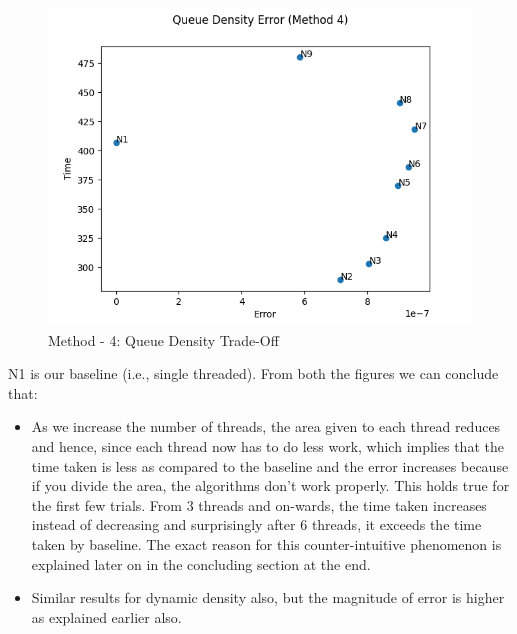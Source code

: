 \documentclass[paper=a4, fontsize = 12pt]{scrartcl}
\numberwithin{equation}{section}		%
\numberwithin{figure}{section}			%
\numberwithin{table}{section}				%
\begin{document}
\begin{figure}[H]
    \centering
    \captionsetup{justification=centering,margin=2cm}
    \includegraphics[width = 15cm]{method4_tradeoff_queue.png}
    \caption{Method - 4: Queue Density Trade-Off}
    \label{fig:M4QueueTradeOff}
\end{figure}
N1 is our baseline (i.e., single threaded). From both the figures we can conclude that: 

\begin{itemize}
    \item As we increase the number of threads, the area given to each thread reduces and hence, since each thread now has to do less work, which implies that the time taken is less as compared to the baseline and the error increases because if you divide the area, the algorithms don't work properly. This holds true for the first few trials. From 3 threads and on-wards, the time taken increases instead of decreasing and surprisingly after 6 threads, it exceeds the time taken by baseline. The exact reason for this counter-intuitive phenomenon is explained later on in the concluding section at the end.
    
    \item Similar results for dynamic density also, but the magnitude of error is higher as explained earlier also.
    
\end{itemize}
\end{document}
